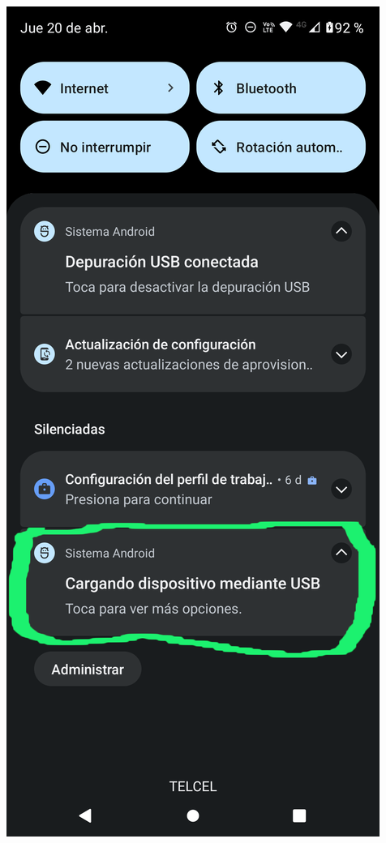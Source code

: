 \begin{frame}
\begin{columns}
\begin{center}
\end{center}

\begin{center}
\includegraphics[width=0.95\linewidth]{01_Configurar/ModoConexion1.png}    
\end{center}


\end{columns}
\end{frame}
